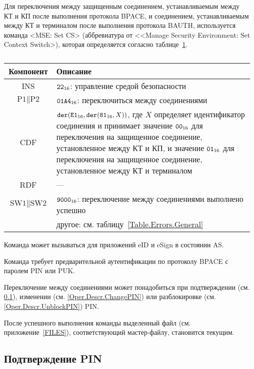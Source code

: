 Для переключения между защищенным соединением,
устанавливаемым между КТ и КП после выполнения 
протокола BPACE, и соединением, 
устанавливаемым между КТ и терминалом после выполнения 
протокола BAUTH, используется 
команда <MSE: Set CS> (аббревиатура от <<Manage Security Environment: Set 
Context Switch>),
которая определяется согласно 
таблице~\ref{Table.Oper.SetCSCmd}.

\begin{table}[hbt]
\caption{}\label{Table.Oper.SetCSCmd}
\begin{tabular}{|c|p{14cm}|}
\hline
Компонент & Описание \\
\hline
\hline
INS & $\texttt{22}_{16}$: управление средой безопасности\\ 
\hline
$\text{P1} \parallel\text{P2}$ & $\texttt{01A4}_{16}$: 
переключиться между соединениями \\
\hline
CDF & 
$\texttt{der}(\texttt{E1}_{16}, \texttt{der}(\texttt{81}_{16}, X))$, 
где $X$ определяет идентификатор
соединения и принимает значение $\texttt{00}_{16}$ для
переключения на защищенное соединение,
установленное между КТ и КП,
и значение $\texttt{01}_{16}$ для переключения на защищенное
соединение, установленное между КТ и терминалом\\ 
\hline 
RDF &  --- \\
\hline
$\text{SW1} \parallel \text{SW2}$ & 
$\texttt{9000}_{16}$: переключение между соединениями выполнено успешно \\
 & другое: см. таблицу~\ref{Table.Errors.General} \\
\hline
\end{tabular}
\end{table}

Команда может вызываться для приложений eID и eSign
в состоянии AS.

Команда требует предварительной аутентификации по протоколу BPACE
с паролем PIN или PUK.

Переключение между соединениями может понадобиться
при подтверждении (см. \ref{Oper.Descr.VerifyPIN}), 
изменении (см. \ref{Oper.Descr.ChangePIN})
или разблокировке (см. \ref{Oper.Descr.UnblockPIN}) PIN.

После успешного выполнения команды выделенный файл (см.
приложение~\ref{FILES}), 
соответствующий мастер-файлу, становится текущим.

\subsection{Подтверждение PIN}
\label{Oper.Descr.VerifyPIN}

